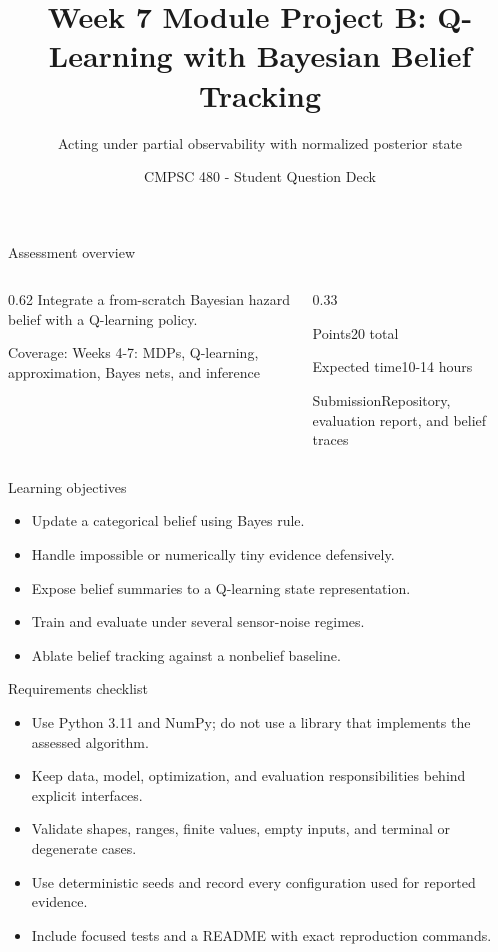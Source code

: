 \documentclass[aspectratio=169,11pt]{beamer}
\title[Module Project B Questions]{Week 7 Module Project B: Q-Learning with Bayesian Belief Tracking}
\subtitle{Acting under partial observability with normalized posterior state}
\author{CMPSC 480 - Student Question Deck}
\date{}
\begin{document}
\begin{frame}
  \titlepage
\end{frame}

\begin{frame}{Assessment overview}
\begin{columns}[T,onlytextwidth]
\begin{column}{0.62\textwidth}
\Large Integrate a from-scratch Bayesian hazard belief with a Q-learning policy.

\vspace{0.35cm}
\normalsize
Coverage: Weeks 4-7: MDPs, Q-learning, approximation, Bayes nets, and inference
\end{column}
\begin{column}{0.33\textwidth}
\begin{block}{Points}20 total\end{block}
\begin{block}{Expected time}10-14 hours\end{block}
\begin{block}{Submission}Repository, evaluation report, and belief traces\end{block}
\end{column}
\end{columns}
\end{frame}

\begin{frame}{Learning objectives}
\begin{itemize}
  \item Update a categorical belief using Bayes rule.
  \item Handle impossible or numerically tiny evidence defensively.
  \item Expose belief summaries to a Q-learning state representation.
  \item Train and evaluate under several sensor-noise regimes.
  \item Ablate belief tracking against a nonbelief baseline.
\end{itemize}
\end{frame}

\begin{frame}{Requirements checklist}
\small
\begin{itemize}
  \item Use Python 3.11 and NumPy; do not use a library that implements the assessed algorithm.
  \item Keep data, model, optimization, and evaluation responsibilities behind explicit interfaces.
  \item Validate shapes, ranges, finite values, empty inputs, and terminal or degenerate cases.
  \item Use deterministic seeds and record every configuration used for reported evidence.
  \item Include focused tests and a README with exact reproduction commands.
\end{itemize}
\end{frame}
\end{document}
